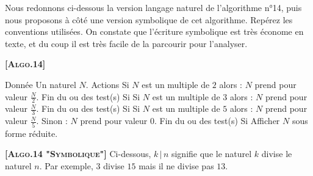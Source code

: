 Nous redonnons ci-dessous la version \og langage naturel \fg{} de l'algorithme n°14, puis nous proposons à côté une version symbolique de  cet algorithme. Repérez les conventions utilisées. On constate que l'écriture \og symbolique \fg{} est très économe en texte, et du coup il est très facile de la parcourir pour l'analyser.

\begin{multicols}{2}
    {\small\textbf{\textsc{[Algo.14]}}}
    \bigskip
    \begin{myverb}
Donnée
    Un naturel \(N\).
Actions
    Si \(N\) est un multiple de \(2\) alors :
        \(N\) prend pour valeur \(\frac{N}{2}\).
    Fin du ou des test(s) Si
    Si \(N\) est un multiple de \(3\) alors :
        \(N\) prend pour valeur \(\frac{N}{3}\).
    Fin du ou des test(s) Si
    Si \(N\) est un multiple de \(5\) alors :
        \(N\) prend pour valeur \(\frac{N}{5}\).
    Sinon :
        \(N\) prend pour valeur \(0\).
    Fin du ou des test(s) Si
    Afficher \(N\) sous forme réduite.
    \end{myverb}

    \switchcol

    {\small\textbf{\textsc{[Algo.14 "Symbolique"]}}}
    Ci-dessous, $k \, | \, n$ signifie que le naturel $k$ divise le naturel $n$.
    Par exemple, $3$ divise $15$ mais il ne divise pas $13$.
    \bigskip
    \begin{algo}
    \end{algo}
\end{multicols}



